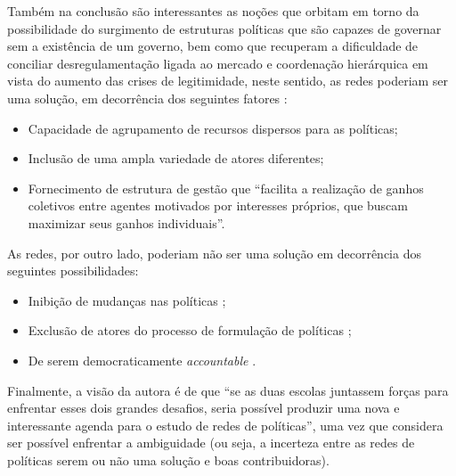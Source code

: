 \documentclass[
article,			%
11pt,				%
oneside,			%
a4paper,			%
english,			%
brazil,				%
sumario=tradicional
]{abntex2}
\begin{document}
	Também na conclusão são interessantes as noções que orbitam em torno da possibilidade do surgimento de estruturas políticas que são capazes de governar sem a existência de um governo, bem como que recuperam a dificuldade de conciliar desregulamentação ligada ao mercado e coordenação hierárquica em vista do aumento das crises de legitimidade, neste sentido, as redes poderiam ser uma solução, em decorrência dos seguintes fatores \cite[p. 249]{borzel2008a}:
	
	\begin{itemize}
		\item Capacidade de agrupamento de recursos dispersos para as políticas;
		\item Inclusão de uma ampla variedade de atores diferentes;
		\item Fornecimento de estrutura de gestão que ``facilita a realização de ganhos coletivos entre agentes motivados por interesses próprios, que buscam	maximizar seus ganhos individuais''.
	\end{itemize}

	As redes, por outro lado, poderiam não ser uma solução em decorrência dos seguintes possibilidades:
	
	\begin{itemize}
		\item Inibição de mudanças nas políticas ;
		\item Exclusão de atores do processo de formulação de políticas ;
		\item De serem democraticamente \textit{accountable} .
	\end{itemize}

	Finalmente, a visão da autora é de que ``se as duas escolas juntassem forças para enfrentar esses dois grandes desafios, seria possível produzir uma nova e interessante agenda para o estudo de redes de políticas'', uma vez que considera ser possível enfrentar a ambiguidade (ou seja, a incerteza entre as redes de políticas serem ou não uma solução e boas contribuidoras).

	
	\postextual
	
	
	
\end{document}
